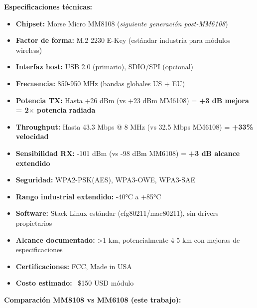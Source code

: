 \textbf{Especificaciones técnicas:}
\begin{itemize}
    \item \textbf{Chipset:} Morse Micro MM8108 (\textit{siguiente generación post-MM6108})
    \item \textbf{Factor de forma:} M.2 2230 E-Key (estándar industria para módulos wireless)
    \item \textbf{Interfaz host:} USB 2.0 (primario), SDIO/SPI (opcional)
    \item \textbf{Frecuencia:} 850-950 MHz (bandas globales US + EU)
    \item \textbf{Potencia TX:} Hasta +26 dBm (vs +23 dBm MM6108) = \textbf{+3 dB mejora = 2$\times$ potencia radiada}
    \item \textbf{Throughput:} Hasta 43.3 Mbps @ 8 MHz (vs 32.5 Mbps MM6108) = \textbf{+33\% velocidad}
    \item \textbf{Sensibilidad RX:} -101 dBm (vs -98 dBm MM6108) = \textbf{+3 dB alcance extendido}
    \item \textbf{Seguridad:} WPA2-PSK(AES), WPA3-OWE, WPA3-SAE
    \item \textbf{Rango industrial extendido:} -40°C a +85°C
    \item \textbf{Software:} Stack Linux estándar (cfg80211/mac80211), sin drivers propietarios
    \item \textbf{Alcance documentado:} >1 km, potencialmente 4-5 km con mejoras de especificaciones
    \item \textbf{Certificaciones:} FCC, Made in USA
    \item \textbf{Costo estimado:} ~\$150 USD módulo
\end{itemize}

\textbf{Comparación MM8108 vs MM6108 (este trabajo):}

